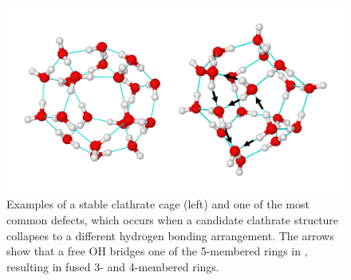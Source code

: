 \begin{figure}[t]
\uwsinglespace
\begin{center}
\includegraphics[width=\textwidth]{Figures/Chapter_6/clathrate_distortion_comparison.png}
\end{center}
\begin{spacing}{1.0}
\caption[Examples of a stable  clathrate cage (left) and one of the most common defects, which occurs when a candidate clathrate structure collapses to a different hydrogen bonding arrangement. The arrows show that a free OH bridges one of the 5-membered rings in , resulting in fused 3- and 4-membered rings.]{Examples of a stable  clathrate cage (left) and one of the most common defects, which occurs when a candidate clathrate structure collapses to a different hydrogen bonding arrangement. The arrows show that a free OH bridges one of the 5-membered rings in , resulting in fused 3- and 4-membered rings.}\label{fig:MBE_III_F3}
\end{spacing}
\end{figure}